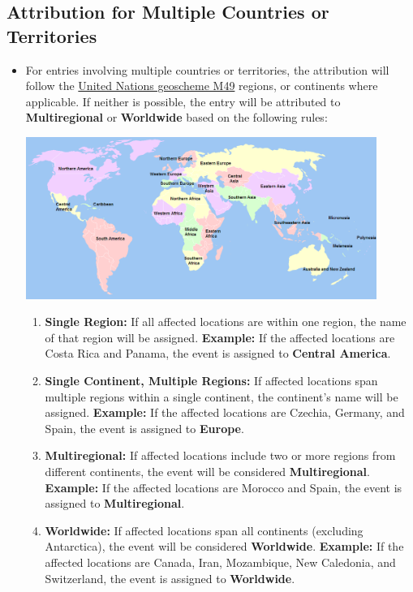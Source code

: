 \documentclass[a4paper,12pt]{article}
\begin{document}
\subsection{Attribution for Multiple Countries or Territories}
\begin{itemize}
    \item For entries involving multiple countries or territories, the attribution will follow the \href{https://en.wikipedia.org/wiki/United_Nations_geoscheme}{United Nations geoscheme M49} regions, or continents where applicable. If neither is possible, the entry will be attributed to \textbf{Multiregional} or \textbf{Worldwide} based on the following rules:

    \begin{center}
        \includegraphics[width=0.9\textwidth]{images/UN_regions.png}
    \end{center}

    \begin{enumerate}
        \renewcommand{\labelenumi}{(\textit{\textbf{\roman{enumi}}})}
        \item \textbf{Single Region:} If all affected locations are within one region, the name of that region will be assigned. \textbf{Example:} If the affected locations are Costa Rica and Panama, the event is assigned to \textbf{Central America}.

        \item \textbf{Single Continent, Multiple Regions:} If affected locations span multiple regions within a single continent, the continent's name will be assigned. \textbf{Example:} If the affected locations are Czechia, Germany, and Spain, the event is assigned to \textbf{Europe}.

        \item \textbf{Multiregional:} If affected locations include two or more regions from different continents, the event will be considered \textbf{Multiregional}. \textbf{Example:} If the affected locations are Morocco and Spain, the event is assigned to \textbf{Multiregional}.

        \item \textbf{Worldwide:} If affected locations span all continents (excluding Antarctica), the event will be considered \textbf{Worldwide}. \textbf{Example:} If the affected locations are Canada, Iran, Mozambique, New Caledonia, and Switzerland, the event is assigned to \textbf{Worldwide}.
    \end{enumerate}
\end{itemize}
\end{document}
